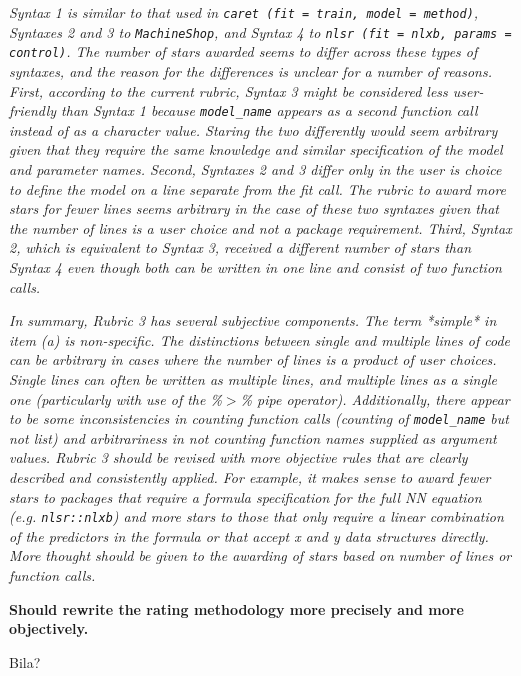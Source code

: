 \documentclass[12pt]{article}
\newcommand{\code}{\texttt}
\newcommand{\red}[1]{{\color{red}#1}}
\begin{document}
\begin{enumerate}
\textit{Syntax 1 is similar to that used in \code{caret (fit = train, model = method)}, Syntaxes 2 and 3 to \code{MachineShop}, and Syntax 4 to \code{nlsr (fit = nlxb, params = control)}.  
The number of stars awarded seems to differ across these types of syntaxes, and the reason for the differences is unclear for a number of reasons.  
First, according to the current rubric, Syntax 3 might be considered less user-friendly than Syntax 1 because \code{model\_name} 
appears as a second function call instead of as a character value.  
Staring the two differently would seem arbitrary given that they require the same knowledge and similar specification of the model 
and parameter names.  Second, Syntaxes 2 and 3 differ only in the user is choice to define the model on a line separate from the fit call.  
The rubric to award more stars for fewer lines seems arbitrary in the case of these two syntaxes given that the number of lines is 
a user choice and not a package requirement.  
Third, Syntax 2, which is equivalent to Syntax 3, received a different number of stars than Syntax 4 even though both can be written in one line and consist of two function calls.
}

\textit{
In summary, Rubric 3 has several subjective components.  The term *simple* in item (a) is non-specific.  
The distinctions between single and multiple lines of code can be arbitrary in cases where the number of lines is a product of user choices.  
Single lines can often be written as multiple lines, and multiple lines as a single one (particularly with use of the \%$>$\% pipe operator).  
Additionally, there appear to be some inconsistencies in counting function calls (counting of \code{model\_name}  but not list) 
and arbitrariness in not counting function names supplied as argument values. 
Rubric 3 should be revised with more objective rules that are clearly described and consistently applied.  
For example, it makes sense to award fewer stars to packages that require a formula specification for the full NN equation 
(e.g. \code{nlsr::nlxb}) and more stars to those that only require a linear combination of the predictors in the formula or that 
accept x and y data structures directly.  
More thought should be given to the awarding of stars based on number of lines or function calls.
}

\textbf{Should rewrite the rating methodology more precisely and more objectively.}

\red{Bila?}


\end{enumerate}
\end{document}

